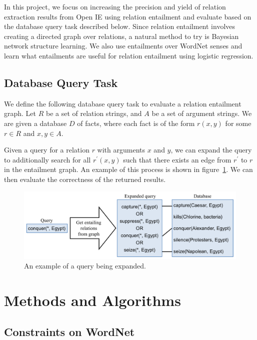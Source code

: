 \documentclass{article}
\begin{document}
In this project, we focus on increasing the precision and yield of relation extraction results from Open IE using relation entailment and evaluate based on the database query task described below. Since relation entailment involves creating a directed graph over relations, a natural method to try is Bayesian network structure learning. We also use entailments over WordNet senses and learn what entailments are useful for relation entailment using logistic regression.

\subsection{Database Query Task}
\label{database-query-task}
We define the following database query task to evaluate a relation entailment graph. Let $R$ be a set of relation strings, and $A$ be a set of argument strings. We are given a database $D$ of facts, where each fact is of the form $r(x, y)$ for some $r\in R$ and $x, y\in A$.

Given a query for a relation $r$ with arguments $x$ and $y$, we can expand the query to additionally search for all $r^\prime(x, y)$ such that there exists an edge from $r^\prime$ to $r$ in the entailment graph. An example of this process is shown in figure~\ref{query-expansion}. We can then evaluate the correctness of the returned results.

\begin{figure}[h]
\begin{center}
\includegraphics[width=1.0\textwidth]{figures/query-expansion.pdf}
\end{center}
\caption{An example of a query being expanded.}\label{query-expansion}
\end{figure}

\section{Methods and Algorithms}

\subsection{Constraints on WordNet}
\end{document}

